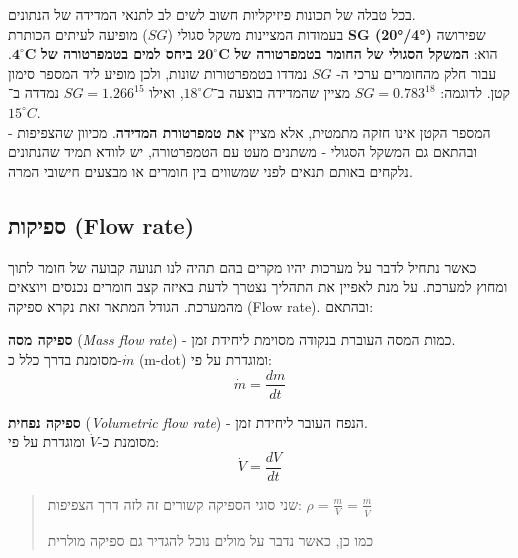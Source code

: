 \documentclass[
  hebrew,
  letterpaper,
  DIV=11,
  numbers=noendperiod]{scrreprt}
\begin{document}
\begin{tcolorbox}[enhanced jigsaw, colback=white, arc=.35mm, coltitle=black, breakable, toptitle=1mm, leftrule=.75mm, colbacktitle=quarto-callout-note-color!10!white, opacitybacktitle=0.6, bottomtitle=1mm, titlerule=0mm, opacityback=0, colframe=quarto-callout-note-color-frame, title=\textcolor{quarto-callout-note-color}{\faInfo}\hspace{0.5em}{הערה}, rightrule=.15mm, bottomrule=.15mm, toprule=.15mm, left=2mm]

בכל טבלה של תכונות פיזיקליות חשוב לשים לב לתנאי המדידה של הנתונים.\\
בעמודות המציינות משקל סגולי (\(SG\)) מופיעה לעיתים הכותרת \textbf{SG
(20°/4°)} שפירושה הוא: \textbf{המשקל הסגולי של החומר בטמפרטורה של}
\(\mathbf{20^\circ C}\) \textbf{ביחס למים בטמפרטורה של}
\(\mathbf{4^\circ C}\). עבור חלק מהחומרים ערכי ה- \(SG\) נמדדו
בטמפרטורות שונות, ולכן מופיע ליד המספר סימון קטן. לדוגמה:
\(SG = {0.783}^{18}\) מציין שהמדידה בוצעה ב־\(18^\circ C\), ואילו
\(SG = {1.266}^{15}\) נמדדה ב־\(15^\circ C\).\\
המספר הקטן אינו חזקה מתמטית, אלא מציין \textbf{את טמפרטורת המדידה}.
מכיוון שהצפיפות - ובהתאם גם המשקל הסגולי - משתנים מעט עם הטמפרטורה, יש
לוודא תמיד שהנתונים נלקחים באותם תנאים לפני שמשווים בין חומרים או מבצעים
חישובי המרה.

\end{tcolorbox}

\subsection{\texorpdfstring{{ספיקות} (Flow
rate)}{ספיקות (Flow rate)}}\label{ux5e1ux5e4ux5d9ux5e7ux5d5ux5ea-flow-rate}

{כאשר נתחיל לדבר על מערכות יהיו מקרים בהם תהיה לנו תנועה קבועה של חומר
לתוך ומחוץ למערכת. על מנת לאפיין את התהליך נצטרך לדעת באיזה קצב חומרים
נכנסים ויוצאים מהמערכת}. {הגודל המתאר זאת נקרא ספיקה} (Flow rate){.
ובהתאם:}

\textbf{ספיקה מסה} (\emph{Mass flow rate}) - כמות המסה העוברת בנקודה
מסוימת ליחידת זמן.\\
מסומנת בדרך כלל כ-\(\dot{m}\) (m-dot) ומוגדרת על פי: \[
\dot{m} = \frac{dm}{dt}
\]

\textbf{ספיקה נפחית} (\emph{Volumetric flow rate}) - הנפח העובר ליחידת
זמן.\\
מסומנת כ-\(\dot{V}\) ומוגדרת על פי: \[
\dot{V} = \frac{dV}{dt}
\]

\begin{quote}
{שני סוגי הספיקה קשורים זה לזה דרך הצפיפות}:
{}\(\rho = \frac{m}{V} = \frac{\overset{.}{m}}{\overset{.}{V}}\) {}

{כמו כן, כאשר נדבר על מולים נוכל להגדיר גם ספיקה מולרית}
\end{quote}
\end{document}
